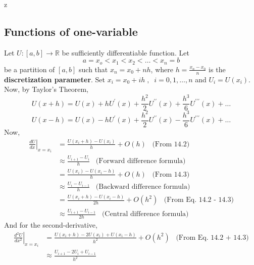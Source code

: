 z\documentclass[a4paper,12pt,twoside]{book}
\newcommand{\nll}[0]{\newline\newline}
\newcommand{\der}[2]{\frac{d #1}{d #2}}
\renewcommand{\d}[0]{\prime}
\begin{document}
\subsection{Functions of one-variable}
Let $U : [a,b] \to \mathbb{R}$ be sufficiently differentiable function. Let
\[a = x_o < x_1 < x_2 < \dots < x_n = b\]
be a partition of $[a,b]$ such that $x_n = x_0 + nh$, where $h = \frac{x_n - x_0}{n}$ is the \textbf{discretization parameter}. 
\nll
Set $x_i = x_0 + ih\;,\;\;i=0,1,\dots,n$ and $U_i = U(x_i)$.
\nll
Now, by Taylor's Theorem,
\begin{equation}
    U(x+h) = U(x) + hU^\d(x) + \frac{h^2}{2} U^{\d\d}(x) + \frac{h^3}{6}U^{\d\d\d}(x) + \dots
\end{equation}
\begin{equation}
    U(x-h) = U(x) - hU^\d(x) + \frac{h^2}{2} U^{\d\d}(x) - \frac{h^3}{6}U^{\d\d\d}(x) + \dots
\end{equation}
Now,
\begin{equation}
    \begin{split}
        \left.\der{U}{x}\right\vert_{x=x_i} &= \frac{U(x_i + h) - U(x_i)}{h} + O(h)\;\;\;\text{(From 14.2)}\\
        &\approx \frac{U_{i+1} - U_i}{h}\;\;\;\text{(Forward difference formula)}\\
        &= \frac{U(x_i) - U(x_i - h)}{h} + O(h)\;\;\;\text{(From 14.3)}\\
        &\approx \frac{U_i - U_{i-1}}{h}\;\;\;\text{(Backward difference formula)}\\
        &= \frac{U(x_i + h) - U(x_i - h)}{2h} + O(h^2)\;\;\;\text{(From Eq. 14.2 - 14.3)}\\
        &\approx \frac{U_{i+1} - U_{i-1}}{2h}\;\;\;\text{(Central difference formula)}
    \end{split}
\end{equation}
And for the second-derivative,
\begin{equation}
    \begin{split}
        \left. \der{^2 U}{x^2} \right\vert_{x=x_i} &= \frac{U(x_i + h) - 2U(x_i) + U(x_i - h)}{h^2} + O(h^2)\;\;\;\text{(From Eq. 14.2 + 14.3)}\\
        &\approx \frac{U_{i+1} - 2U_i + U_{i-1}}{h^2}
    \end{split}
\end{equation}
\end{document}
